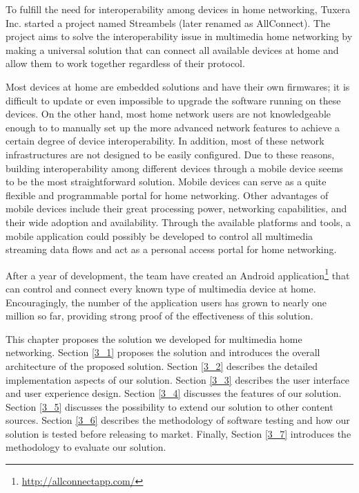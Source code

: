 
To fulfill the need for interoperability among devices in home networking,
Tuxera Inc. started a project named Streambels (later renamed as AllConnect).
The project aims to solve the interoperability issue in multimedia home networking
by making a universal solution that can connect all available devices at home
and allow them to work together regardless of their protocol.

Most devices at home are embedded solutions and have their own firmwares; it is
difficult to update or even impossible to upgrade the software running on these
devices. On the other hand, most home network users
 are not knowledgeable enough to 
to manually set up the more advanced
 network features to achieve a certain degree of device interoperability. In addition, most of these network infrastructures are not designed to be easily
 configured. Due to these reasons, building interoperability among different 
 devices through a mobile device seems to be the most straightforward solution. Mobile devices can serve as a quite flexible and programmable portal for
 home networking.  Other advantages of mobile devices include their great
 processing power, networking capabilities, and their wide adoption and
 availability. Through the available platforms and tools, a mobile application
 could possibly be developed to control all multimedia streaming data flows and
 act as a personal access portal for home networking.

After a year of development, the team have created an Android
application\footnote{\url{http://allconnectapp.com/}} that can control and connect every known type of multimedia device at home.
Encouragingly, the number of the application users has grown to nearly one
million so far, providing strong proof of the effectiveness of this solution.

This chapter proposes the solution we developed for multimedia home networking.
Section \ref{3_1} proposes the solution and introduces the overall architecture
of the proposed solution. Section \ref{3_2} describes the detailed
implementation aspects of our solution. Section \ref{3_3} describes the user
interface and user experience design. Section \ref{3_4} discusses the features
of our solution. Section \ref{3_5} discusses the possibility to extend our
solution to other content sources. Section \ref{3_6} describes the methodology
of software testing and how our solution is tested before releasing to market.
Finally, Section \ref{3_7} introduces the methodology to evaluate our solution.


